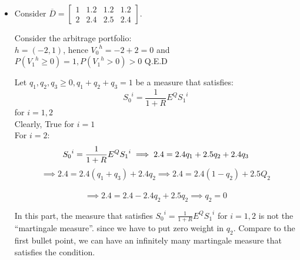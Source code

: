 \documentclass[12pt]{article}
\newcommand{\ol}{\overline}
\begin{document}
\begin{itemize}
\item Consider $\ol{D}=
    \left[\begin{array}{llll}
    1 & 1.2 & 1.2 & 1.2 \\
    2 & 2.4 & 2.5 & 2.4
    \end{array}
    \right]$.
    
Consider the arbitrage portfolio:\\

$h= (-2,1)$, hence ${V_{0}}^{h}= -2+2 = 0$ and $P({V_{1}}^{h} \geq 0) = 1, P({V_{1}}^{h} >0) >0$ Q.E.D
   
Let $q_{1}, q_{2}, q_{3} \geq 0, q_{1} + q_{2} + q_{3} =1 $ be a measure that satisfies: 
$${S_{0}}^{i} = \frac{1}{1+R}E^{Q}{S_{1}}^{i}$$ for $i = 1,2$\\
Clearly, True for $i = 1$\\
For $i =2$:\\

$${S_{0}}^{i} = \frac{1}{1+R}E^{Q}{S_{1}}^{i} \implies 2.4 = 2.4q_{1}+2.5q_{2}+2.4q_{3}\\
$$
$$\implies 2.4 = 2.4(q_{1}+q_{3})+2.4q_{2} \implies 2.4 = 2.4(1-q_{2}) +2.5Q_{2}$$\\
$$\implies 2.4 = 2.4 -2.4q_{2}+2.5q_{2}\implies q_{2}=0$$


 
In this part, the measure that satisfies ${S_{0}}^{i} = \frac{1}{1+R}E^{Q}{S_{1}}^{i}$ for $i = 1,2$ is not the ``martingale measure''. since we have to put zero weight in $q_{2}$. Compare to the first bullet point, we can have an infinitely many martingale measure that satisfies the condition.


\end{itemize}
\end{document}

